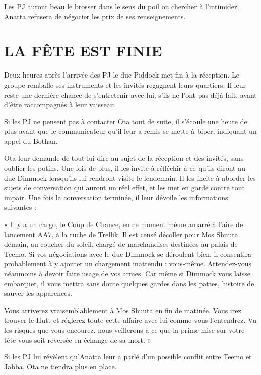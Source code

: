\documentclass[a4paper,10pt,twoside,twocolumn,openany]{book}
\begin{document}
Les PJ auront beau le brosser dans le sens du poil ou
chercher à l’intimider, Anatta refusera de négocier les
prix de ses renseignements.

\section{LA FÊTE EST FINIE}

Deux heures après l’arrivée des PJ le duc Piddock met
fin à la réception. Le groupe remballe ses instruments
et les invités regagnent leurs quartiers. Il leur reste une
dernière chance de s’entretenir avec lui, s’ils ne l’ont pas
déjà fait, avant d’être raccompagnés à leur vaisseau.

Si les PJ ne pensent pas à contacter Ota tout de suite,
il s’écoule une heure de plus avant que le communicateur
qu’il leur a remis se mette à biper, indiquant un appel du
Bothan.

Ota leur demande de tout lui dire au sujet de la réception et des invités, sans oublier les potins. Une fois
de plus, il les invite à réfléchir à ce qu’ils diront au duc
Dimmock lorsqu’ils lui rendront visite le lendemain. Il les
incite à aborder les sujets de conversation qui auront un
réel effet, et les met en garde contre tout impair. Une fois
la conversation terminée, il leur dévoile les informations
suivantes :

\begin{quotebox}
« Il y a un cargo, le Coup de Chance, en ce moment même amarré à l’aire de lancement AA7, à
la ruche de Trellik. Il est censé décoller pour Mos
Shuuta demain, au coucher du soleil, chargé de
marchandises destinées au palais de Teemo. Si
vos négociations avec le duc Dimmock se déroulent bien, il consentira probablement à y ajouter un chargement inattendu : vous-même. Attendez-vous néanmoins à devoir faire usage de vos
armes. Car même si Dimmock vous laisse embarquer, il vous mettra sans doute quelques gardes
dans les pattes, histoire de sauver les apparences.

Vous arriverez vraisemblablement à Mos Shuuta
en fin de matinée. Vous irez trouver le Hutt et réglerez toute cette affaire avec lui comme vous l’entendrez. Vu les risques que vous encourez, nous
veillerons à ce que la prime mise sur votre tête
vous soit reversée en échange de sa mort. »
\end{quotebox}

Si les PJ lui révèlent qu’Anatta leur a parlé d’un possible conflit entre Teemo et Jabba, Ota ne tiendra plus
en place.
\end{document}
